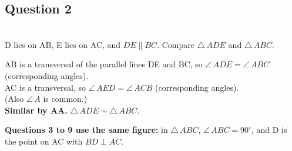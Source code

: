 \documentclass[11pt,a4paper]{article}
\newif\ifsol
\newcommand{\tri}{\triangle\,}
\newcommand{\ang}{\angle\,}
\newcommand{\workspace}{}
\newenvironment{sol}{\setbox0\vbox\bgroup}{\egroup}
\newcommand{\workspace}{\vspace{3.6cm}}
\newcommand{\q}[1]{\ifsol\needspace{11.5cm}\else\needspace{12\baselineskip}\fi\subsection*{Question #1}}
\begin{document}
\q{2}
\begin{center}
\\[2pt]
{\small D lies on AB, E lies on AC, and $DE \parallel BC$. Compare $\tri ADE$ and $\tri ABC$.}
\end{center}
\workspace
\begin{sol}
AB is a transversal of the parallel lines DE and BC, so $\ang ADE = \ang ABC$ (corresponding angles).\\
AC is a transversal, so $\ang AED = \ang ACB$ (corresponding angles).\\
(Also $\ang A$ is common.)\\[2pt]
\textbf{Similar by AA.} $\tri ADE \sim \tri ABC$.
\end{sol}

\bigskip{}
\textbf{Questions 3 to 9 use the same figure:} in $\tri ABC$, $\ang ABC = 90^\circ$, and D is the point on AC with $BD \perp AC$.
\end{document}
